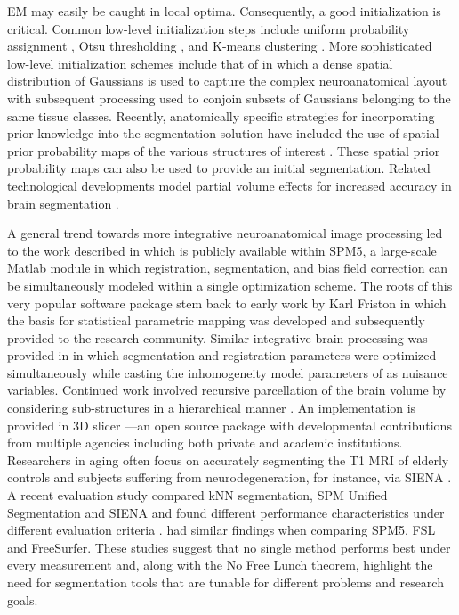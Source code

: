 \documentclass[11pt,english]{article}
\begin{document}
EM may easily be caught in local optima. Consequently, a good
initialization is critical.  Common low-level initialization steps 
include uniform probability assignment \citep{Wells1996},
Otsu thresholding \citep{Zhang2001}, and K-means clustering
\citep{Pappas1992}.  More sophisticated low-level initialization
schemes include that of \cite{Greenspan2006} in which a dense spatial
distribution of Gaussians is used to capture the complex
neuroanatomical layout with subsequent processing used to conjoin
subsets of Gaussians belonging to the same tissue classes.  Recently,
anatomically specific strategies for incorporating prior knowledge
into the segmentation solution have included the use of spatial prior
probability maps of the various structures of interest
\citep{Leemput1999a,Marroquin2002,Ashburner2005}.  These spatial prior
probability maps can also be used to provide an initial segmentation.
Related technological developments model partial volume effects for
increased accuracy in brain segmentation
\citep{Ruan2000,Ballester2002,Leemput2003}.

A general trend towards more integrative neuroanatomical image processing led to the work described in
\cite{Ashburner2005} which is publicly available within SPM5, a
large-scale Matlab module in which registration, segmentation, and
bias field correction can be simultaneously modeled within a single
optimization scheme. The roots of this very popular software package
stem back to early work by Karl Friston in which the basis for
statistical parametric mapping was developed \citep{Friston1990} and
subsequently provided to the research community.  Similar integrative brain processing was provided in \cite{Pohl2006} in which
segmentation and registration parameters were optimized simultaneously
while casting the inhomogeneity model parameters of \cite{Wells1996}
as nuisance variables.  Continued work involved recursive parcellation
of the brain volume by considering sub-structures in a hierarchical
manner \citep{Pohl2007}.  An implementation is provided in 3D slicer
\citep{Pieper2006}---an open source package with developmental
contributions from multiple agencies including both private and
academic institutions. Researchers in aging often focus on
accurately segmenting the T1 MRI of elderly controls and subjects
suffering from neurodegeneration, for instance, via SIENA \citep{Smith2007}.  A recent evaluation study 
compared kNN segmentation, SPM Unified Segmentation and SIENA and
found different performance
characteristics under different evaluation criteria
\citep{Bresser2011}.  \cite{Klauschen2009} had similar findings when
comparing SPM5, FSL and FreeSurfer.  These studies suggest that no
single method performs best under every measurement and, along with the No
Free Lunch theorem, highlight the need for segmentation tools that are tunable for different
problems and research goals.  
\end{document}

